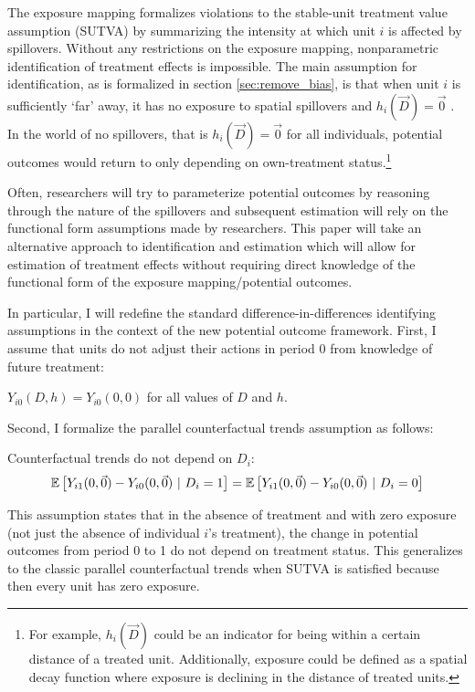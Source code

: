 \documentclass[11pt]{article}
\begin{document}
The exposure mapping formalizes violations to the stable-unit treatment value assumption (SUTVA) by summarizing the intensity at which unit $i$ is affected by spillovers. Without any restrictions on the exposure mapping, nonparametric identification of treatment effects is impossible. The main assumption for identification, as is formalized in section \ref{sec:remove_bias}, is that when unit $i$ is sufficiently `far' away, it has no exposure to spatial spillovers and $h_i(\vec{D}) = \vec{0}$ . In the world of no spillovers, that is $h_i(\vec{D}) = \vec{0}$ for all individuals, potential outcomes would return to only depending on own-treatment status.\footnote{For example, $h_i(\vec{D})$ could be an indicator for being within a certain distance of a treated unit. Additionally, exposure could be defined as a spatial decay function where exposure is declining in the distance of treated units.}

Often, researchers will try to parameterize potential outcomes by reasoning through the nature of the spillovers and subsequent estimation will rely on the functional form assumptions made by researchers. This paper will take an alternative approach to identification and estimation which will allow for estimation of treatment effects without requiring direct knowledge of the functional form of the exposure mapping/potential outcomes. 

In particular, I will redefine the standard difference-in-differences identifying assumptions in the context of the new potential outcome framework. First, I assume that units do not adjust their actions in period $0$ from knowledge of future treatment:
\begin{assumption}[No Anticipation]\label{assumption:no-anticipation}
    $Y_{i0}(D, h) = Y_{i0}(0,0)$ for all values of $D$ and $h$.
\end{assumption}
Second, I formalize the parallel counterfactual trends assumption as follows:
\begin{assumption}\label{assumption:parallel}
    Counterfactual trends do not depend on $D_i$:
    \[ 
        \mathbb{E}\left[Y_{i1}(0, \vec{0}) - Y_{i0}(0, \vec{0}) \ \vert \ D_i = 1 \right] = 
        \mathbb{E}\left[Y_{i1}(0, \vec{0}) - Y_{i0}(0, \vec{0}) \ \vert \ D_i = 0 \right]
    \]
\end{assumption}
This assumption states that in the absence of treatment and with zero exposure (not just the absence of individual $i$'s treatment), the change in potential outcomes from period 0 to 1 do not depend on treatment status. This generalizes to the classic parallel counterfactual trends when SUTVA is satisfied because then every unit has zero exposure. 
\end{document}
